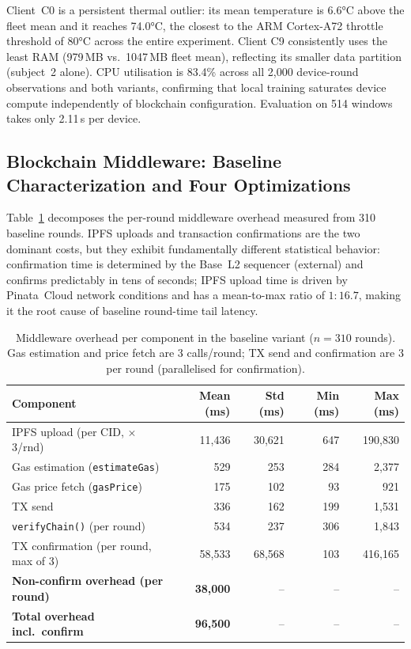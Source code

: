 \documentclass{llncs}
\begin{document}
Client~C0 is a persistent thermal outlier: its mean temperature is
6.6°C above the fleet mean and it reaches 74.0°C, the closest to the
ARM Cortex-A72 throttle threshold of 80°C across the entire experiment.
Client C9 consistently uses the least RAM (979\,MB vs.\ 1047\,MB fleet
mean), reflecting its smaller data partition (subject~2 alone). CPU
utilisation is 83.4\% across all 2{,}000 device-round observations and
both variants, confirming that local training saturates device compute
independently of blockchain configuration. Evaluation on 514 windows
takes only 2.11\,s per device.

\subsection{Blockchain Middleware: Baseline Characterization and Four Optimizations}
\label{subsec:opts}

Table~\ref{tab:overhead} decomposes the per-round middleware overhead
measured from 310 baseline rounds. IPFS uploads and transaction
confirmations are the two dominant costs, but they exhibit fundamentally
different statistical behavior: confirmation time is determined by the
Base~L2 sequencer (external) and confirms predictably in tens of seconds;
IPFS upload time is driven by Pinata~Cloud network conditions and has a
mean-to-max ratio of $1{:}16.7$, making it the root cause of baseline
round-time tail latency.

\begin{table}[t]
\caption{Middleware overhead per component in the baseline variant
  ($n=310$ rounds). Gas estimation and price fetch are 3 calls/round;
  TX send and confirmation are 3 per round (parallelised for confirmation).}
\label{tab:overhead}
\centering\scriptsize
\setlength{\tabcolsep}{2pt}
\begin{tabular}{lrrrr}
\toprule
\textbf{Component} & \textbf{Mean (ms)} & \textbf{Std (ms)}
  & \textbf{Min (ms)} & \textbf{Max (ms)} \\
\midrule
IPFS upload (per CID, $\times$3/rnd)
  & 11{,}436 & 30{,}621 & \phantom{0}647 & 190{,}830 \\
Gas estimation (\texttt{estimateGas})
  & \phantom{0}529 & \phantom{00}253 & \phantom{0}284 & \phantom{00}2{,}377 \\
Gas price fetch (\texttt{gasPrice})
  & \phantom{0}175 & \phantom{00}102 & \phantom{00}93 & \phantom{00,0}921 \\
TX send                                
  & \phantom{0}336 & \phantom{00}162 & \phantom{0}199 & \phantom{00}1{,}531 \\
\texttt{verifyChain()} (per round)     
  & \phantom{0}534 & \phantom{00}237 & \phantom{0}306 & \phantom{00}1{,}843 \\
TX confirmation (per round, max of 3)  
  & 58{,}533 & 68{,}568 & \phantom{00}103 & 416{,}165 \\
\midrule
\textbf{Non-confirm overhead (per round)}
  & \textbf{38{,}000} & -- & -- & -- \\
\textbf{Total overhead incl.\ confirm}
  & \textbf{96{,}500} & -- & -- & -- \\
\bottomrule
\end{tabular}
\end{table}
\end{document}
